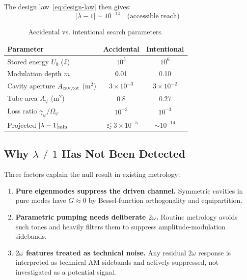 The design law~\eqref{eq:design-law} then gives:
\begin{equation}
\boxed{|\lambda - 1| \sim 10^{-14} \quad \text{(accessible reach)}}
\label{eq:intentional-reach}
\end{equation}

\begin{table}[h]
\caption{Accidental vs. intentional search parameters.}
\label{tab:lambda-parameters}
\begin{ruledtabular}
\begin{tabular}{lcc}
Parameter & Accidental & Intentional \\
\hline
Stored energy $U_0$ (J) & $10^5$ & $10^6$ \\
Modulation depth $m$ & 0.01 & 0.10 \\
Cavity aperture $A_{\rm cav,tot}$ (m$^2$) & $3 \times 10^{-3}$ & $3 \times 10^{-2}$ \\
Tube area $A_\psi$ (m$^2$) & 0.8 & 0.27 \\
Loss ratio $\gamma_\psi/\Omega_\psi$ & $10^{-3}$ & $10^{-3}$ \\
\hline
Projected $|\lambda - 1|_{\rm min}$ & $\lesssim 3 \times 10^{-5}$ & $\sim 10^{-14}$ \\
\end{tabular}
\end{ruledtabular}
\end{table}

\subsection{Why $\lambda \neq 1$ Has Not Been Detected}\label{sec:why-not-seen}

Three factors explain the null result in existing metrology:

\begin{enumerate}
\item \textbf{Pure eigenmodes suppress the driven channel.}
Symmetric cavities in pure modes have $G \approx 0$ by Bessel-function 
orthogonality and equipartition.

\item \textbf{Parametric pumping needs deliberate $2\omega$.}
Routine metrology avoids such tones and heavily filters them to suppress 
amplitude-modulation sidebands.

\item \textbf{$2\omega$ features treated as technical noise.}
Any residual $2\omega$ response is interpreted as technical AM sidebands 
and actively suppressed, not investigated as a potential signal.
\end{enumerate}

